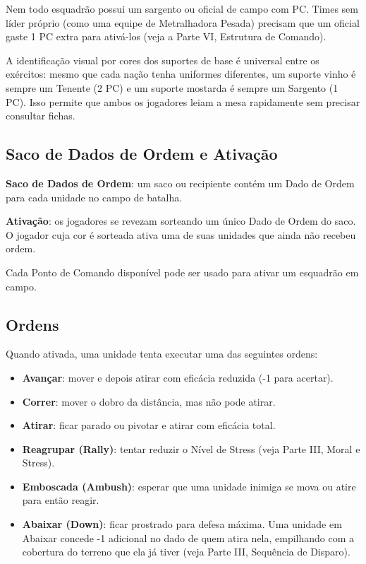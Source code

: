 \begin{nota}
Nem todo esquadrão possui um sargento ou oficial de campo com PC. Times sem líder próprio (como uma equipe de Metralhadora Pesada) precisam que um oficial gaste 1 PC extra para ativá-los (veja a Parte VI, Estrutura de Comando).
\end{nota}

A identificação visual por cores dos suportes de base é universal entre os exércitos: mesmo que cada nação tenha uniformes diferentes, um suporte vinho é sempre um Tenente (2 PC) e um suporte mostarda é sempre um Sargento (1 PC). Isso permite que ambos os jogadores leiam a mesa rapidamente sem precisar consultar fichas.

\subsection{Saco de Dados de Ordem e Ativação}

\textbf{Saco de Dados de Ordem}: um saco ou recipiente contém um Dado de Ordem para cada unidade no campo de batalha.

\textbf{Ativação}: os jogadores se revezam sorteando um único Dado de Ordem do saco. O jogador cuja cor é sorteada ativa uma de suas unidades que ainda não recebeu ordem.

Cada Ponto de Comando disponível pode ser usado para ativar um esquadrão em campo.

\subsection{Ordens}

Quando ativada, uma unidade tenta executar uma das seguintes ordens:

\begin{itemize}[leftmargin=1.2cm]
  \item \textbf{Avançar}: mover e depois atirar com eficácia reduzida (-1 para acertar).
  \item \textbf{Correr}: mover o dobro da distância, mas não pode atirar.
  \item \textbf{Atirar}: ficar parado ou pivotar e atirar com eficácia total.
  \item \textbf{Reagrupar (Rally)}: tentar reduzir o Nível de Stress (veja Parte III, Moral e Stress).
  \item \textbf{Emboscada (Ambush)}: esperar que uma unidade inimiga se mova ou atire para então reagir.
  \item \textbf{Abaixar (Down)}: ficar prostrado para defesa máxima. Uma unidade em Abaixar concede -1 adicional no dado de quem atira nela, empilhando com a cobertura do terreno que ela já tiver (veja Parte III, Sequência de Disparo).
\end{itemize}

